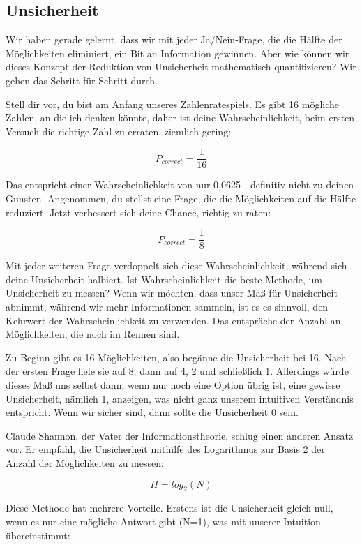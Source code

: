 \documentclass[
  letterpaper,
  DIV=11]{scrreprt}
\begin{document}
\subsection{Unsicherheit}\label{unsicherheit}

Wir haben gerade gelernt, dass wir mit jeder Ja/Nein-Frage, die die
Hälfte der Möglichkeiten eliminiert, ein Bit an Information gewinnen.
Aber wie können wir dieses Konzept der Reduktion von Unsicherheit
mathematisch quantifizieren? Wir gehen das Schritt für Schritt durch.

Stell dir vor, du bist am Anfang unseres Zahlenratespiels. Es gibt 16
mögliche Zahlen, an die ich denken könnte, daher ist deine
Wahrscheinlichkeit, beim ersten Versuch die richtige Zahl zu erraten,
ziemlich gering:

\[
P_{correct} = \frac{1}{16}
\]

Das entspricht einer Wahrscheinlichkeit von nur 0,0625 - definitiv nicht
zu deinen Gunsten. Angenommen, du stellst eine Frage, die die
Möglichkeiten auf die Hälfte reduziert. Jetzt verbessert sich deine
Chance, richtig zu raten:

\[
P_{correct} = \frac{1}{8}
\]

Mit jeder weiteren Frage verdoppelt sich diese Wahrscheinlichkeit,
während sich deine Unsicherheit halbiert. Ist Wahrscheinlichkeit die
beste Methode, um Unsicherheit zu messen? Wenn wir möchten, dass unser
Maß für Unsicherheit abnimmt, während wir mehr Informationen sammeln,
ist es es sinnvoll, den Kehrwert der Wahrscheinlichkeit zu verwenden.
Das entspräche der Anzahl an Möglichkeiten, die noch im Rennen sind.

Zu Beginn gibt es 16 Möglichkeiten, also begänne die Unsicherheit bei
16. Nach der ersten Frage fiele sie auf 8, dann auf 4, 2 und schließlich
1. Allerdings würde dieses Maß uns selbst dann, wenn nur noch eine
Option übrig ist, eine gewisse Unsicherheit, nämlich 1, anzeigen, was
nicht ganz unserem intuitiven Verständnis entspricht. Wenn wir sicher
sind, dann sollte die Unsicherheit 0 sein.

Claude Shannon, der Vater der Informationstheorie, schlug einen anderen
Ansatz vor. Er empfahl, die Unsicherheit mithilfe des Logarithmus zur
Basis 2 der Anzahl der Möglichkeiten zu messen:

\[
H = log_2(N)
\]

Diese Methode hat mehrere Vorteile. Erstens ist die Unsicherheit gleich
null, wenn es nur eine mögliche Antwort gibt (N=1), was mit unserer
Intuition übereinstimmt:
\end{document}
